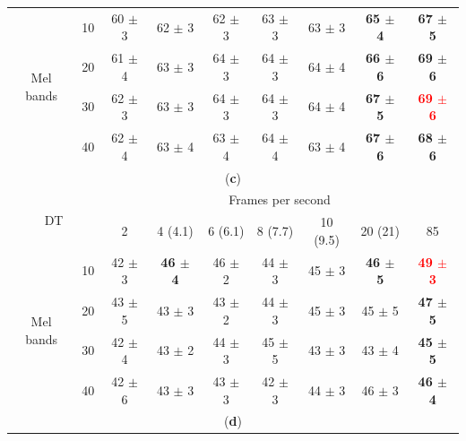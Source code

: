 \documentclass[sensors,article,accept,moreauthors,pdftex,10pt,a4paper]{mdpi}
\begin{document}
\begin{table}[H]
\begin{tabular}{ccccccccc}
\multicolumn{1}{c}{\multirow{4}{*}{Mel bands}}
 & \multicolumn{1}{c}{10} & 60 $\pm$ 3 & 62 $\pm$ 3 & 62 $\pm$ 3 & 63 $\pm$ 3 & 63 $\pm$ 3 & \textbf{65 $\pm$ 4} & \textbf{67 $\pm$ 5} \\ 
\multicolumn{1}{c}{}
 & \multicolumn{1}{c}{20} & 61 $\pm$ 4 & 63 $\pm$ 3 & 64 $\pm$ 3 & 64 $\pm$ 3 & 64 $\pm$ 4 & \textbf{66 $\pm$ 6} & \textbf{69 $\pm$ 6} \\ 
\multicolumn{1}{c}{}
 & \multicolumn{1}{c}{30} & 62 $\pm$ 3 & 63 $\pm$ 3 & 64 $\pm$ 3 & 64 $\pm$ 3 & 64 $\pm$ 4 & \textbf{67 $\pm$ 5} & \textbf{\textcolor{red}{69 $\pm$ 6}} \\ 
\multicolumn{1}{c}{}
 & \multicolumn{1}{c}{40} & 62 $\pm$ 4 & 63 $\pm$ 4 & 63 $\pm$ 4 & 64 $\pm$ 4 & 63 $\pm$ 4 & \textbf{67 $\pm$ 6} & \textbf{68 $\pm$ 6} \\ 

\midrule

\multicolumn{9}{c}{(\textbf{c})}\\

\midrule

\multicolumn{2}{c}{\multirow{2}{*}{DT}} & \multicolumn{7}{c}{Frames per second}\\ 
\cmidrule{2-9}
 & & 2 & 4 (4.1) & 6 (6.1) & 8 (7.7) & 10 (9.5) & 20 (21) & 85 \\ 

\midrule

\multicolumn{1}{c}{\multirow{4}{*}{Mel bands}}
 & \multicolumn{1}{c}{10} & 42 $\pm$ 3 & \textbf{46 $\pm$ 4} & 46 $\pm$ 2 & 44 $\pm$ 3 & 45 $\pm$ 3 & \textbf{46 $\pm$ 5} & \textbf{\textcolor{red}{49 $\pm$ 3}} \\ 
\multicolumn{1}{c}{}
 & \multicolumn{1}{c}{20} & 43 $\pm$ 5 & 43 $\pm$ 3 & 43 $\pm$ 2 & 44 $\pm$ 3 & 45 $\pm$ 3 & 45 $\pm$ 5 & \textbf{47 $\pm$ 5} \\ 
\multicolumn{1}{c}{}
 & \multicolumn{1}{c}{30} & 42 $\pm$ 4 & 43 $\pm$ 2 & 44 $\pm$ 3 & 45 $\pm$ 5 & 43 $\pm$ 3 & 43 $\pm$ 4 & \textbf{45 $\pm$ 5} \\ 
\multicolumn{1}{c}{}
 & \multicolumn{1}{c}{40} & 42 $\pm$ 6 & 43 $\pm$ 3 & 43 $\pm$ 3 & 42 $\pm$ 3 & 44 $\pm$ 3 & 46 $\pm$ 3 & \textbf{46 $\pm$ 4} \\ 

\midrule

\multicolumn{9}{c}{(\textbf{d})}\\

\cmidrule{1-9}


\end{tabular}
\end{table}
\end{document}

